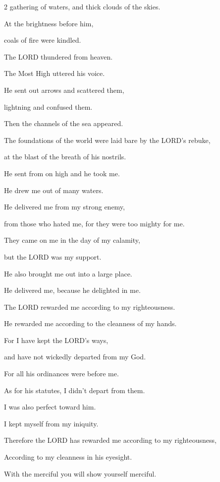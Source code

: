 \begin{multicols}{2}
gathering of waters, and thick clouds of the skies.

\myverse{}At the brightness before him,

coals of fire were kindled.

\myverse{}The LORD thundered from heaven.

The Most High uttered his voice.

\myverse{}He sent out arrows and scattered them,

lightning and confused them.

\myverse{}Then the channels of the sea appeared.

The foundations of the world were laid bare by the LORD’s rebuke,

at the blast of the breath of his nostrils.


\vspace{\baselineskip}
\myverse{}He sent from on high and he took me.

He drew me out of many waters.

\myverse{}He delivered me from my strong enemy,

from those who hated me, for they were too mighty for me.

\myverse{}They came on me in the day of my calamity,

but the LORD was my support.

\myverse{}He also brought me out into a large place.

He delivered me, because he delighted in me.


\vspace{\baselineskip} 
\myverse{}The LORD rewarded me according to my righteousness.

He rewarded me according to the cleanness of my hands.

\myverse{}For I have kept the LORD’s ways,

and have not wickedly departed from my God.

\myverse{}For all his ordinances were before me.

As for his statutes, I didn’t depart from them.

\myverse{}I was also perfect toward him.

I kept myself from my iniquity.

\myverse{}Therefore the LORD has rewarded me according to my righteousness,

According to my cleanness in his eyesight.


\vspace{\baselineskip} 
\myverse{}With the merciful you will show yourself merciful.


\end{multicols}
